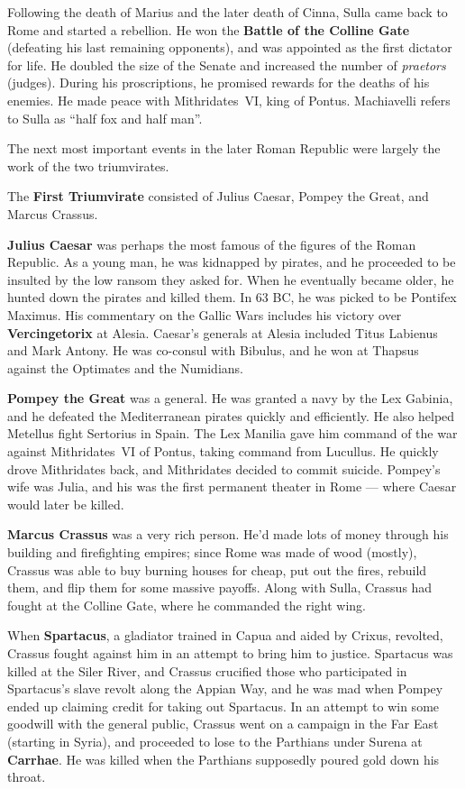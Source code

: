 Following the death of Marius and the later death of Cinna,
Sulla came back to Rome and started a rebellion.
He won the \textbf{Battle of the Colline Gate} (defeating his last remaining opponents),
and was appointed as the first dictator for life.
He doubled the size of the Senate and increased the number of \textit{praetors} (judges).
During his proscriptions, he promised rewards for the deaths of his enemies.
He made peace with Mithridates~VI, king of Pontus.
Machiavelli refers to Sulla as ``half fox and half man''.

The next most important events in the later Roman Republic were largely the work of the two triumvirates.

The \textbf{First Triumvirate} consisted of Julius Caesar, Pompey the Great, and Marcus Crassus.

\textbf{Julius Caesar} was perhaps the most famous of the figures of the Roman Republic.
As a young man, he was kidnapped by pirates,
and he proceeded to be insulted by the low ransom they asked for.
When he eventually became older, he hunted down the pirates and killed them.
In 63 BC, he was picked to be Pontifex Maximus.
His commentary on the Gallic Wars includes his victory over \textbf{Vercingetorix} at Alesia.
Caesar's generals at Alesia included Titus Labienus and Mark Antony.
He was co-consul with Bibulus, and he won at Thapsus against the Optimates and the Numidians.

\textbf{Pompey the Great} was a general.
He was granted a navy by the Lex Gabinia, and he defeated the Mediterranean pirates quickly and efficiently.
He also helped Metellus fight Sertorius in Spain.
The Lex Manilia gave him command of the war against Mithridates~VI of Pontus, taking command from Lucullus.
He quickly drove Mithridates back, and Mithridates decided to commit suicide.
Pompey's wife was Julia,
and his was the first permanent theater in Rome --- where Caesar would later be killed.

\textbf{Marcus Crassus} was a very rich person.
He'd made lots of money through his building and firefighting empires;
since Rome was made of wood (mostly), Crassus was able to buy burning houses for cheap,
put out the fires, rebuild them, and flip them for some massive payoffs.
Along with Sulla, Crassus had fought at the Colline Gate, where he commanded the right wing.

When \textbf{Spartacus}, a gladiator trained in Capua and aided by Crixus, revolted,
Crassus fought against him in an attempt to bring him to justice.
Spartacus was killed at the Siler River, and
Crassus crucified those who participated in Spartacus's slave revolt along the Appian Way,
and he was mad when Pompey ended up claiming credit for taking out Spartacus.
In an attempt to win some goodwill with the general public,
Crassus went on a campaign in the Far East (starting in Syria),
and proceeded to lose to the Parthians under Surena at \textbf{Carrhae}.
He was killed when the Parthians supposedly poured gold down his throat.

